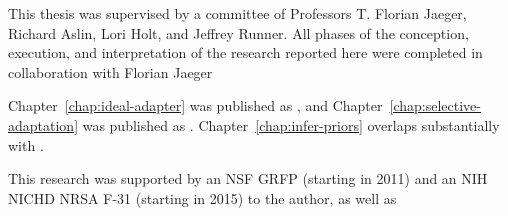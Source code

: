 \begin{contributorsandfunding}
  This thesis was supervised by a committee of Professors T. Florian Jaeger,
  Richard Aslin, Lori Holt, and Jeffrey Runner. All phases of the conception,
  execution, and interpretation of the research reported here were completed in
  collaboration with Florian Jaeger

  Chapter~\ref{chap:ideal-adapter} was published as ,
  and Chapter~\ref{chap:selective-adaptation} was published as
  . Chapter~\ref{chap:infer-priors} overlaps substantially with .

  This research was supported by an NSF GRFP (starting in 2011) and an NIH NICHD NRSA F-31 (starting in 2015) to the author, as well as 
\end{contributorsandfunding}